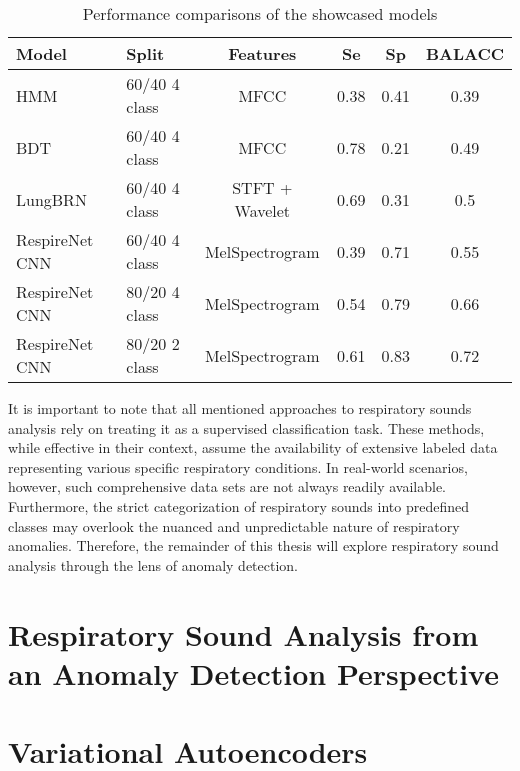 \begin{table}[h!]
    \centering
    \caption{
        Performance comparisons of the showcased models 
    }
    \begin{tabularx}{\linewidth}{lXcccc}
    \toprule
    \textbf{Model}        & \textbf{Split} & \textbf{Features} & \textbf{Se} & \textbf{Sp} & \textbf{BALACC} \\
    \midrule
    HMM                   & 60/40 4 class          & MFCC              & 0.38                & 0.41                 & 0.39 \\
    BDT                   & 60/40 4 class          & MFCC              & 0.78                & 0.21                 & 0.49 \\
    LungBRN               & 60/40 4 class          & STFT + Wavelet    & 0.69                & 0.31                 & 0.5  \\
    RespireNet CNN        & 60/40 4 class          & MelSpectrogram    & 0.39                & 0.71                 & 0.55 \\
    RespireNet CNN        & 80/20 4 class  & MelSpectrogram    & 0.54                & 0.79                 & 0.66 \\
    RespireNet CNN        & 80/20 2 class  & MelSpectrogram    & 0.61                & 0.83                 & 0.72 \\
    \bottomrule
    \end{tabularx}
\end{table}

    
It is important to note that all mentioned approaches to respiratory sounds analysis rely on treating it as a supervised classification task. These methods, while effective in their context, assume the availability of extensive labeled data representing various specific respiratory conditions. In real-world scenarios, however, such comprehensive data sets are not always readily available. Furthermore, the strict categorization of respiratory sounds into predefined classes may overlook the nuanced and unpredictable nature of respiratory anomalies. Therefore, the remainder of this thesis will explore respiratory sound analysis through the lens of anomaly detection.

\section{Respiratory Sound Analysis from an Anomaly Detection Perspective}
\section{Variational Autoencoders}

